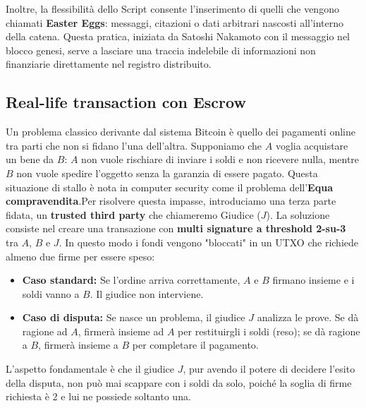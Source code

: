 Inoltre, la flessibilità dello Script consente l'inserimento di quelli che vengono chiamati \textbf{Easter Eggs}: messaggi, citazioni o dati arbitrari nascosti all'interno della catena. Questa pratica, iniziata da Satoshi Nakamoto con il messaggio nel blocco genesi, serve a lasciare una traccia indelebile di informazioni non finanziarie direttamente nel registro distribuito.

\subsection{Real-life transaction con Escrow}
Un problema classico derivante dal sistema Bitcoin è quello dei pagamenti online tra parti che non si fidano l'una dell'altra. Supponiamo che $A$ voglia acquistare un bene da $B$: $A$ non vuole rischiare di inviare i soldi e non ricevere nulla, mentre $B$ non vuole spedire l'oggetto senza la garanzia di essere pagato. Questa situazione di stallo è nota in computer security come il problema dell'\textbf{Equa compravendita}.Per risolvere questa impasse, introduciamo una terza parte fidata, un \textbf{trusted third party} che chiameremo Giudice ($J$). La soluzione consiste nel creare una transazione con \textbf{multi signature a threshold 2-su-3} tra $A$, $B$ e $J$. In questo modo i fondi vengono "bloccati" in un UTXO che richiede almeno due firme per essere speso:
\begin{itemize}
    \item \textbf{Caso standard:} Se l'ordine arriva correttamente, $A$ e $B$ firmano insieme e i soldi vanno a $B$. Il giudice non interviene.
    \item \textbf{Caso di disputa:} Se nasce un problema, il giudice $J$ analizza le prove. Se dà ragione ad $A$, firmerà insieme ad $A$ per restituirgli i soldi (reso); se dà ragione a $B$, firmerà insieme a $B$ per completare il pagamento.
\end{itemize}
L'aspetto fondamentale è che il giudice $J$, pur avendo il potere di decidere l'esito della disputa, non può mai scappare con i soldi da solo, poiché la soglia di firme richiesta è 2 e lui ne possiede soltanto una.

